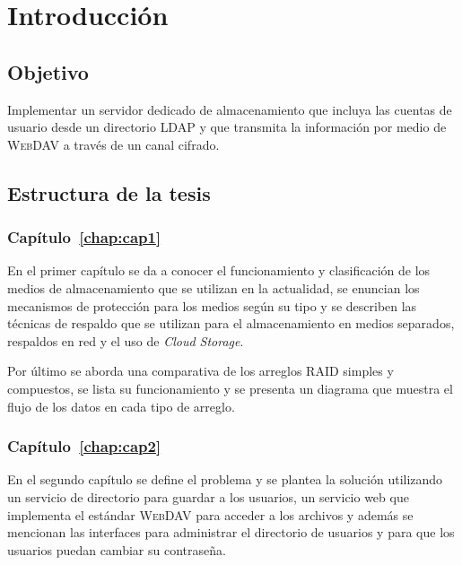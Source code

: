 \label{chap:intro}
\chapter*{Introducci\'{o}n}

  \section*{Objetivo}

Implementar un servidor dedicado de almacenamiento que incluya las cuentas de usuario desde un directorio \textsc{LDAP} y que transmita la informaci\'{o}n por medio de \textsc{WebDAV} a trav\'{e}s de un canal cifrado.

  \section*{Estructura de la tesis}

    \subsection*{Cap\'{i}tulo~\ref{chap:cap1}}

En el primer cap\'{i}tulo se da a conocer el funcionamiento y clasificaci\'{o}n de los medios de almacenamiento que se utilizan en la actualidad, se enuncian los mecanismos de protecci\'{o}n para los medios seg\'{u}n su tipo y se describen las t\'{e}cnicas de respaldo que se utilizan para el almacenamiento en medios separados, respaldos en red y el uso de \textit{Cloud Storage}.

Por \'{u}ltimo se aborda una comparativa de los arreglos RAID simples y compuestos, se lista su funcionamiento y se presenta un diagrama que muestra el flujo de los datos en cada tipo de arreglo.

    \subsection*{Cap\'{i}tulo~\ref{chap:cap2}}

En el segundo cap\'{i}tulo se define el problema y se plantea la soluci\'{o}n utilizando un servicio de directorio para guardar a los usuarios, un servicio web que implementa el est\'{a}ndar \textsc{WebDAV} para acceder a los archivos y adem\'{a}s se mencionan las interfaces para administrar el directorio de usuarios y para que los usuarios puedan cambiar su contrase\~{n}a.

